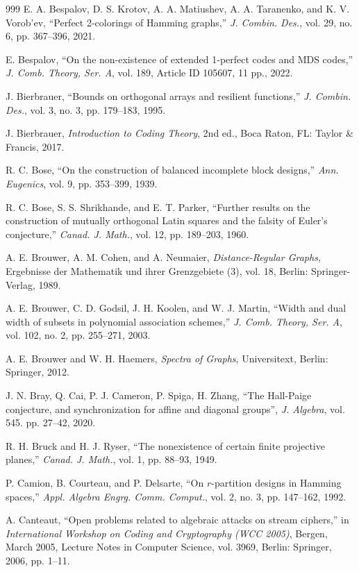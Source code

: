 \documentclass[11pt]{article}
\theoremstyle{definition}
\begin{document}
{{{\begin{thebibliography}{999}
E. A. Bespalov, D. S. Krotov, A. A. Matiushev, A. A. Taranenko, and K. V. Vorob'ev,
``Perfect 2-colorings of Hamming graphs,''
\textit{J. Combin. Des.}, vol. 29, no. 6, pp. 367--396, 2021.

E. Bespalov,
``On the non-existence of extended 1-perfect codes and MDS codes,''
\textit{J. Comb. Theory, Ser. A}, vol. 189, Article ID 105607, 11 pp., 2022.

J. Bierbrauer,
``Bounds on orthogonal arrays and resilient functions,''
\textit{J. Combin. Des.}, vol. 3, no. 3, pp. 179--183, 1995.

J. Bierbrauer,
\textit{Introduction to Coding Theory}, 2nd ed.,
Boca Raton, FL: Taylor \& Francis, 2017.

R. C. Bose,
``On the construction of balanced incomplete block designs,''
\textit{Ann. Eugenics}, vol. 9, pp. 353--399, 1939.

R. C. Bose, S. S. Shrikhande, and E. T. Parker,
``Further results on the construction of mutually orthogonal Latin squares and the falsity of Euler's conjecture,''
\textit{Canad. J. Math.}, vol. 12, pp. 189--203, 1960.

A. E. Brouwer, A. M. Cohen, and A. Neumaier,
\textit{Distance-Regular Graphs},
Ergebnisse der Mathematik und ihrer Grenzgebiete (3), vol. 18,
Berlin: Springer-Verlag, 1989.

A. E. Brouwer, C. D. Godsil, J. H. Koolen, and W. J. Martin,
``Width and dual width of subsets in polynomial association schemes,''
\textit{J. Comb. Theory, Ser. A}, vol. 102, no. 2, pp. 255--271, 2003.

A. E. Brouwer and W. H. Haemers,
\textit{Spectra of Graphs},
Universitext, Berlin: Springer, 2012.

J. N. Bray, Q. Cai, P. J. Cameron, P. Spiga, H. Zhang,
``The Hall-Paige conjecture, and synchronization for affine and
diagonal groups'',
 \textit{J. Algebra}, vol. 545. pp. 27--42, 2020.

R. H. Bruck and H. J. Ryser,
``The nonexistence of certain finite projective planes,''
\textit{Canad. J. Math.}, vol. 1, pp. 88--93, 1949.

P. Camion, B. Courteau, and P. Delsarte,
``On $r$-partition designs in Hamming spaces,''
\textit{Appl. Algebra Engrg. Comm. Comput.}, vol. 2, no. 3, pp. 147--162, 1992.

A. Canteaut,
``Open problems related to algebraic attacks on stream ciphers,''
in \textit{International Workshop on Coding and Cryptography (WCC 2005)},
Bergen, March 2005, Lecture Notes in Computer Science, vol. 3969,
Berlin: Springer, 2006, pp. 1--11.


\end{thebibliography}}}}
\end{document}
